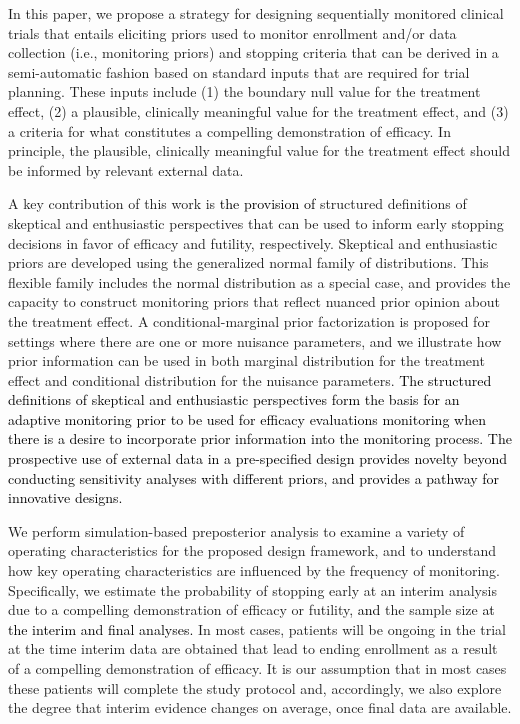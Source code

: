 \documentclass[12pt]{article}
\begin{document}
In this paper, we propose a strategy for designing sequentially monitored clinical trials that entails eliciting 
priors used to monitor enrollment and/or data collection (i.e., monitoring priors) and stopping criteria that can 
be derived in a semi-automatic fashion based on standard inputs that are required for trial planning. 
%
These inputs include (1) the boundary null value for the treatment effect, (2) a plausible, clinically meaningful 
value for the treatment effect, and (3) a criteria for what constitutes a compelling demonstration of efficacy. 
%
In principle, the plausible, clinically meaningful value for the treatment effect should be informed by relevant external data. 


A key contribution of this work is \textcolor{black}{the provision of} structured definitions of skeptical and enthusiastic perspectives that can be used 
to inform early stopping decisions in favor of efficacy and futility, respectively. Skeptical and enthusiastic priors are developed using the generalized normal family of distributions. 
This flexible family includes the normal distribution as a special case, and provides the capacity to construct monitoring 
priors that reflect nuanced prior opinion about the treatment effect. 
A conditional-marginal prior factorization is proposed for settings where there are one or more nuisance 
parameters, and we illustrate how prior information can be used in both marginal 
distribution for the treatment effect and conditional distribution for the nuisance parameters. 
%
\textcolor{black}{The structured definitions of skeptical and enthusiastic perspectives form the basis for an adaptive monitoring prior to be used for efficacy evaluations monitoring when there is a desire to incorporate prior information into the monitoring process. The prospective use of external data in a pre-specified design provides novelty beyond conducting sensitivity analyses with different priors, and provides a pathway for innovative designs.}

We perform simulation-based preposterior analysis to examine a variety of operating characteristics for the proposed design framework,
and to understand how key operating characteristics are influenced by the frequency of monitoring.
Specifically, we estimate the probability of stopping early at an interim analysis due to a compelling demonstration of efficacy or futility, \textcolor{black}{and} the sample size \textcolor{black}{at the interim and final analyses.}
In most cases, patients will be ongoing in the trial at the time interim data are obtained that lead to 
ending enrollment as a result of a compelling demonstration of efficacy. 
It is our assumption that in most cases these patients will complete the study protocol and, accordingly, we also explore 
the degree that interim evidence changes on average, once final data are available.	
\end{document}
